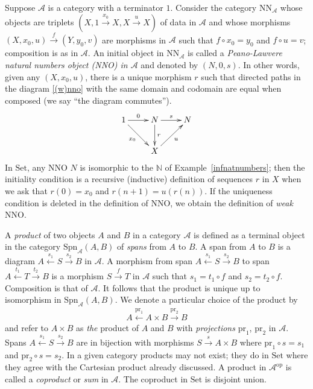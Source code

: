 \documentclass[a4paper,12pt]{article}
\theoremstyle{step}
\newcommand{\xra}{\xrightarrow}
\newcommand{\xla}{\xleftarrow}
\def\CA{{\mathscr A}}
\begin{document}
Suppose $\CA$ is a category with a terminator $1$. Consider the category $\mathrm{NN}_{\CA}$
whose objects are triplets $(X, 1\xra{x_0}X, X\xra{u}X)$ of data in $\CA$ and whose morphisms
$(X,x_0,u)\xra{f}(Y, y_0,v)$ are morphisms in $\CA$ such that $f\circ x_0=y_0$ and $f\circ u=v$;
composition is as in $\CA$. An initial object in $\mathrm{NN}_{\CA}$ is called a 
{\em Peano-Lawvere natural numbers object (NNO) in $\CA$} and denoted by $(N, 0, s)$.
In other words, given any $(X,x_0,u)$, there is a unique morphism $r$ such that directed 
paths in the diagram \eqref{(w)nno} with the same domain and codomain are equal when composed
(we say ``the diagram commutes''). 
\begin{eqnarray}\label{(w)nno}
\begin{aligned}
\xymatrix{
1 \ar[r]^-{0} \ar[rd]_-{x_0} & N \ar[d]^-{r} \ar[r]^-{s}  & N  \\
& X \ar[ru]_-{u} }
\end{aligned}
\end{eqnarray}
In $\mathrm{Set}$, any NNO $N$ is isomorphic to the $\mathbb{N}$ of Example~\ref{infnatnumbers};
then the initiality condition is a recursive (inductive) definition of sequences $r$ in $X$ 
when we ask that $r(0) = x_0$ and $r(n+1)= u(r(n))$. 
If the uniqueness condition is deleted in the definition of NNO, we obtain the definition of {\em weak} NNO. 

A {\em product} of two objects $A$ and $B$ in a category $\CA$ is defined as a terminal object
in the category $\mathrm{Spn}_{\CA}(A,B)$ of {\em spans} from $A$ to $B$. A span from $A$
to $B$ is a diagram $A\xla{s_1}S\xra{s_2}B$ in $\CA$. A morphism from span $A\xla{s_1}S\xra{s_2}B$ to span $A\xla{t_1}T\xra{t_2}B$ is a morphism $S\xra{f}T$ in $\CA$ such that $s_1 = t_1 \circ f$
and $s_2 = t_2 \circ f$. Composition is that of $\CA$. It follows that the product is unique up to isomorphism in $\mathrm{Spn}_{\CA}(A,B)$. We denote a particular choice of the product by
\begin{eqnarray*}
A\xla{\mathrm{pr}_1}A \times B\xra{\mathrm{pr}_2}B
\end{eqnarray*}
and refer to $A \times B$ as {\em the} product of $A$ and $B$ with {\em projections} $\mathrm{pr}_1$,
$\mathrm{pr}_2$ in $\CA$. Spans $A\xla{s_1}S\xra{s_2}B$ are in bijection with morphisms 
$S\xra{s} A\times B$ where $\mathrm{pr}_1\circ s = s_1$ and $\mathrm{pr}_2\circ s = s_2$.
In a given category products may not exist; they do in $\mathrm{Set}$ where they agree with the
Cartesian product already discussed. A product in $\CA^{\mathrm{op}}$ is called a {\em coproduct}
or {\em sum} in $\CA$. The coproduct in $\mathrm{Set}$ is disjoint union. 
\end{document}
